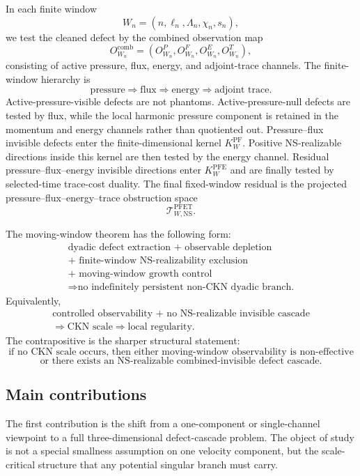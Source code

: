 \documentclass[11pt]{article}
\numberwithin{equation}{section}
\theoremstyle{plain}
\theoremstyle{definition}
\theoremstyle{remark}
\newcommand{\NS}{\mathrm{NS}}
\newcommand{\PF}{\mathrm{PF}}
\newcommand{\PFE}{\mathrm{PFE}}
\newcommand{\PFET}{\mathrm{PFET}}
\begin{document}
In each finite window
\[
        W_n=(n,\ell_n,\Lambda_n,\chi_n,s_n),
\]
we test the cleaned defect by the combined observation map
\[
        O^{\mathrm{comb}}_{W_n}
        =
        (O^P_{W_n},O^F_{W_n},O^E_{W_n},O^T_{W_n}),
\]
consisting of active pressure, flux, energy, and adjoint-trace channels.  The finite-window hierarchy is
\[
        \text{pressure}
        \Longrightarrow
        \text{flux}
        \Longrightarrow
        \text{energy}
        \Longrightarrow
        \text{adjoint trace}.
\]
Active-pressure-visible defects are not phantoms.  Active-pressure-null defects are tested by flux, while the local harmonic pressure component is retained in the momentum and energy channels rather than quotiented out.  Pressure--flux invisible defects enter the finite-dimensional kernel \(K_W^{\PF}\).  Positive NS-realizable directions inside this kernel are then tested by the energy channel.  Residual pressure--flux--energy invisible directions enter \(K_W^{\PFE}\) and are finally tested by selected-time trace-cost duality.  The final fixed-window residual is the projected pressure--flux--energy--trace obstruction space
\[
        \mathcal T^{\PFET}_{W,\NS}.
\]

The moving-window theorem has the following form:
\[
\boxed{
\begin{gathered}
\text{dyadic defect extraction + observable depletion}\\
\text{+ finite-window NS-realizability exclusion}\\
\text{+ moving-window growth control}\\
\Longrightarrow
\text{no indefinitely persistent non-CKN dyadic branch.}
\end{gathered}}
\]
Equivalently,
\[
\boxed{
\begin{gathered}
\text{controlled observability + no NS-realizable invisible cascade}\\
\Longrightarrow \text{CKN scale} \Longrightarrow \text{local regularity.}
\end{gathered}}
\]
The contrapositive is the sharper structural statement:
\[
\boxed{
\text{if no CKN scale occurs, then either moving-window observability is non-effective}
}
\]
\[
\boxed{
\text{or there exists an NS-realizable combined-invisible defect cascade.}
}
\]

\subsection*{Main contributions}

The first contribution is the shift from a one-component or single-channel viewpoint to a full three-dimensional defect-cascade problem.  The object of study is not a special smallness assumption on one velocity component, but the scale-critical structure that any potential singular branch must carry.
\end{document}
